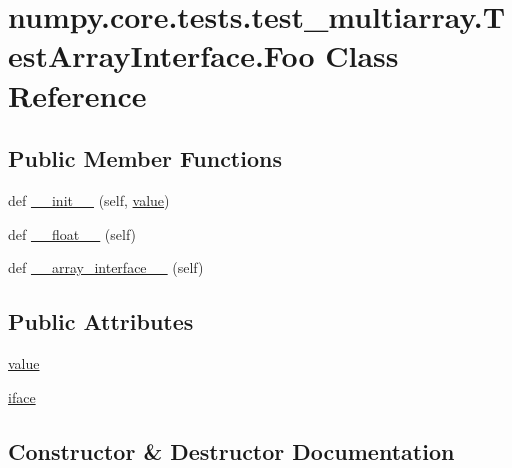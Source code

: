 \hypertarget{classnumpy_1_1core_1_1tests_1_1test__multiarray_1_1TestArrayInterface_1_1Foo}{}\section{numpy.\+core.\+tests.\+test\+\_\+multiarray.\+Test\+Array\+Interface.\+Foo Class Reference}
\label{classnumpy_1_1core_1_1tests_1_1test__multiarray_1_1TestArrayInterface_1_1Foo}
\subsection*{Public Member Functions}
\begin{DoxyCompactItemize}
\item 
def \hyperlink{classnumpy_1_1core_1_1tests_1_1test__multiarray_1_1TestArrayInterface_1_1Foo_ab04b8bde3690a701f8fff49915f541ee}{\+\_\+\+\_\+init\+\_\+\+\_\+} (self, \hyperlink{classnumpy_1_1core_1_1tests_1_1test__multiarray_1_1TestArrayInterface_1_1Foo_acd3cce7547c2cd8f61dabbb71ce09898}{value})
\item 
def \hyperlink{classnumpy_1_1core_1_1tests_1_1test__multiarray_1_1TestArrayInterface_1_1Foo_ab4776a970f77e4ccf07e6a7572d4b544}{\+\_\+\+\_\+float\+\_\+\+\_\+} (self)
\item 
def \hyperlink{classnumpy_1_1core_1_1tests_1_1test__multiarray_1_1TestArrayInterface_1_1Foo_a20d98743f40dc8ac9909b1ab86066768}{\+\_\+\+\_\+array\+\_\+interface\+\_\+\+\_\+} (self)
\end{DoxyCompactItemize}
\subsection*{Public Attributes}
\begin{DoxyCompactItemize}
\item 
\hyperlink{classnumpy_1_1core_1_1tests_1_1test__multiarray_1_1TestArrayInterface_1_1Foo_acd3cce7547c2cd8f61dabbb71ce09898}{value}
\item 
\hyperlink{classnumpy_1_1core_1_1tests_1_1test__multiarray_1_1TestArrayInterface_1_1Foo_a30a53fe3a1d06507a3cad750dbdbd480}{iface}
\end{DoxyCompactItemize}


\subsection{Constructor \& Destructor Documentation}
\mbox{\label{classnumpy_1_1core_1_1tests_1_1test__multiarray_1_1TestArrayInterface_1_1Foo_ab04b8bde3690a701f8fff49915f541ee}} 
